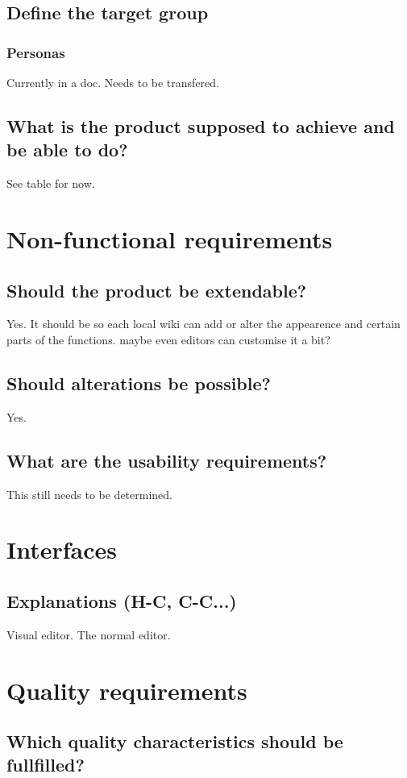 \documentclass{article}
\begin{document}
\subsection{Define the target group}
\subsubsection{Personas}

Currently in a doc. Needs to be transfered.

\subsection{What is the product supposed to achieve and be able to do?}

See table for now.

\section{Non-functional requirements}

\subsection{Should the product be extendable?}

Yes. It should be so each local wiki can add or alter the appearence and certain parts of the functions. maybe even editors can customise it a bit?

\subsection{Should alterations be possible?}

Yes.

\subsection{What are the usability requirements?}

This still needs to be determined.

\section{Interfaces}

\subsection{Explanations (H-C, C-C...)}

Visual editor. The normal editor.

\section{Quality requirements}

\subsection{Which quality characteristics should be fullfilled?}
\end{document}
